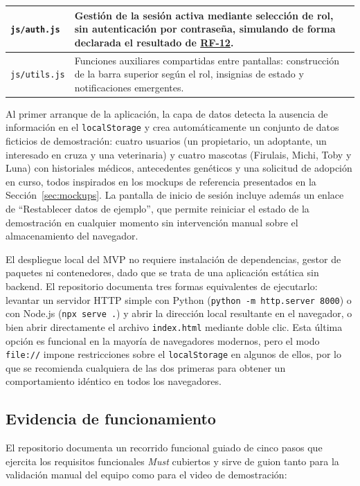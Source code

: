 \documentclass[journal,onecolumn]{IEEEtran}
\begin{document}
\begin{longtable}{@{}p{4.2cm} p{10.6cm}@{}}
		\hline
		\texttt{js/auth.js} & Gestión de la sesión activa mediante selección de rol, sin autenticación por contraseña, simulando de forma declarada el resultado de \hyperref[tab:RF-12]{RF-12}. \\
		\hline
		\texttt{js/utils.js} & Funciones auxiliares compartidas entre pantallas: construcción de la barra superior según el rol, insignias de estado y notificaciones emergentes. \\
	\end{longtable}
	
	Al primer arranque de la aplicación, la capa de datos detecta la ausencia de
	información en el \texttt{localStorage} y crea automáticamente un conjunto
	de datos ficticios de demostración: cuatro usuarios (un propietario, un
	adoptante, un interesado en cruza y una veterinaria) y cuatro mascotas
	(Firulais, Michi, Toby y Luna) con historiales médicos, antecedentes
	genéticos y una solicitud de adopción en curso, todos inspirados en los
	mockups de referencia presentados en la
	Sección~\ref{sec:mockups}. La pantalla de inicio de sesión incluye
	además un enlace de \enquote{Restablecer datos de ejemplo}, que permite
	reiniciar el estado de la demostración en cualquier momento sin intervención
	manual sobre el almacenamiento del navegador.
	
	El despliegue local del MVP no requiere instalación de dependencias, gestor
	de paquetes ni contenedores, dado que se trata de una aplicación estática
	sin backend. El repositorio documenta tres formas equivalentes de
	ejecutarlo: levantar un servidor HTTP simple con Python
	(\texttt{python -m http.server 8000}) o con Node.js (\texttt{npx serve .})
	y abrir la dirección local resultante en el navegador, o bien abrir
	directamente el archivo \texttt{index.html} mediante doble clic. Esta
	última opción es funcional en la mayoría de navegadores modernos, pero el
	modo \texttt{file://} impone restricciones sobre el \texttt{localStorage} en
	algunos de ellos, por lo que se recomienda cualquiera de las dos primeras
	para obtener un comportamiento idéntico en todos los navegadores.
	
	\subsection{Evidencia de funcionamiento}
	\label{sec:mvp-evidencia}
	
	El repositorio documenta un recorrido funcional guiado de cinco pasos que
	ejercita los requisitos funcionales \emph{Must} cubiertos y sirve de guion
	tanto para la validación manual del equipo como para el video de
	demostración:
	
\end{document}
